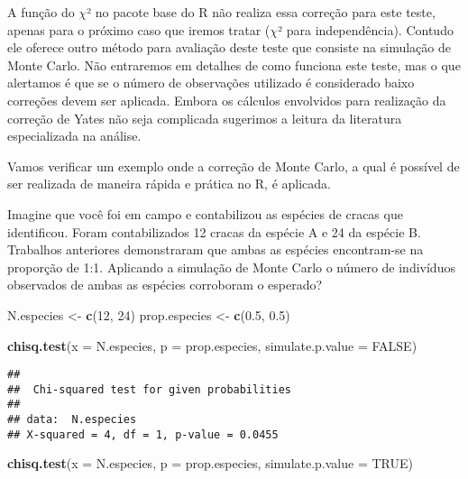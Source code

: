 \documentclass[titlepage, oneside, openany, a4paper]{book}
\newenvironment{Shaded}{\begin{snugshade}}{\end{snugshade}}
\newcommand{\DataTypeTok}[1]{\textcolor[rgb]{0.13,0.29,0.53}{#1}}
\newcommand{\DecValTok}[1]{\textcolor[rgb]{0.00,0.00,0.81}{#1}}
\newcommand{\FloatTok}[1]{\textcolor[rgb]{0.00,0.00,0.81}{#1}}
\newcommand{\KeywordTok}[1]{\textcolor[rgb]{0.13,0.29,0.53}{\textbf{#1}}}
\newcommand{\NormalTok}[1]{#1}
\newcommand{\OtherTok}[1]{\textcolor[rgb]{0.56,0.35,0.01}{#1}}
\newcommand{\StringTok}[1]{\textcolor[rgb]{0.31,0.60,0.02}{#1}}
\begin{document}
A função do \(\chi\)² no pacote base do R não realiza essa correção para este teste, apenas para o próximo caso que iremos tratar (\(\chi\)² para independência). Contudo ele oferece outro método para avaliação deste teste que consiste na simulação de Monte Carlo. Não entraremos em detalhes de como funciona este teste, mas o que alertamos é que se o número de observações utilizado é considerado baixo correções devem ser aplicada. Embora os cálculos envolvidos para realização da correção de Yates não seja complicada sugerimos a leitura da literatura especializada na análise.

Vamos verificar um exemplo onde a correção de Monte Carlo, a qual é possível de ser realizada de maneira rápida e prática no R, é aplicada.

Imagine que você foi em campo e contabilizou as espécies de cracas que identificou. Foram contabilizados 12 cracas da espécie A e 24 da espécie B. Trabalhos anteriores demonstraram que ambas as espécies encontram-se na proporção de 1:1. Aplicando a simulação de Monte Carlo o número de indivíduos observados de ambas as espécies corroboram o esperado?

\begin{Shaded}
\begin{Highlighting}[]
\NormalTok{N.especies <-}\StringTok{ }\KeywordTok{c}\NormalTok{(}\DecValTok{12}\NormalTok{, }\DecValTok{24}\NormalTok{)}
\NormalTok{prop.especies <-}\StringTok{ }\KeywordTok{c}\NormalTok{(}\FloatTok{0.5}\NormalTok{, }\FloatTok{0.5}\NormalTok{)}

\KeywordTok{chisq.test}\NormalTok{(}\DataTypeTok{x =}\NormalTok{ N.especies, }\DataTypeTok{p =}\NormalTok{ prop.especies, }\DataTypeTok{simulate.p.value =} \OtherTok{FALSE}\NormalTok{)}
\end{Highlighting}
\end{Shaded}

\begin{verbatim}
## 
##  Chi-squared test for given probabilities
## 
## data:  N.especies
## X-squared = 4, df = 1, p-value = 0.0455
\end{verbatim}

\begin{Shaded}
\begin{Highlighting}[]
\KeywordTok{chisq.test}\NormalTok{(}\DataTypeTok{x =}\NormalTok{ N.especies, }\DataTypeTok{p =}\NormalTok{ prop.especies, }\DataTypeTok{simulate.p.value =} \OtherTok{TRUE}\NormalTok{)}
\end{Highlighting}
\end{Shaded}
\end{document}
